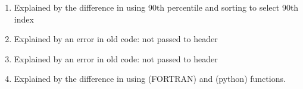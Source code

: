 \begin{landscape}
{\begin{tabular}{lllllllr}
& & & & & \\

\hline
\hline
\end{tabular}
}
\begin{enumerate}
\item Explained by the difference in using 90th percentile and sorting to select 90th index
\item Explained by an error in old code:  not passed to header
\item Explained by an error in old code:  not passed to header
\item Explained by the difference in using  (FORTRAN) and  (python) functions.
\end{enumerate}
\end{landscape}


